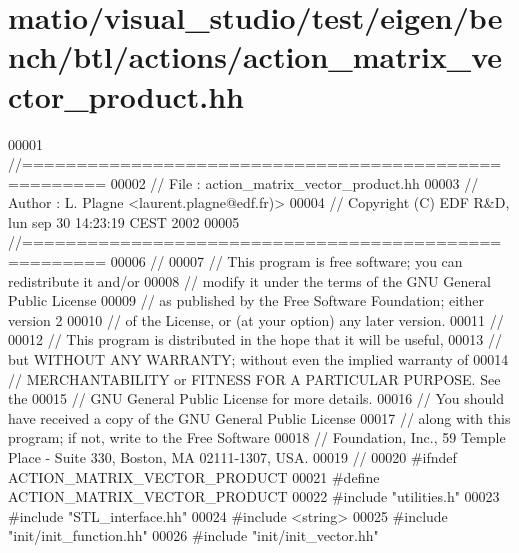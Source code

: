 \hypertarget{matio_2visual__studio_2test_2eigen_2bench_2btl_2actions_2action__matrix__vector__product_8hh_source}{}\section{matio/visual\+\_\+studio/test/eigen/bench/btl/actions/action\+\_\+matrix\+\_\+vector\+\_\+product.hh}
\label{matio_2visual__studio_2test_2eigen_2bench_2btl_2actions_2action__matrix__vector__product_8hh_source}

\begin{DoxyCode}
00001 \textcolor{comment}{//=====================================================}
00002 \textcolor{comment}{// File   :  action\_matrix\_vector\_product.hh}
00003 \textcolor{comment}{// Author :  L. Plagne <laurent.plagne@edf.fr)>}
00004 \textcolor{comment}{// Copyright (C) EDF R&D,  lun sep 30 14:23:19 CEST 2002}
00005 \textcolor{comment}{//=====================================================}
00006 \textcolor{comment}{//}
00007 \textcolor{comment}{// This program is free software; you can redistribute it and/or}
00008 \textcolor{comment}{// modify it under the terms of the GNU General Public License}
00009 \textcolor{comment}{// as published by the Free Software Foundation; either version 2}
00010 \textcolor{comment}{// of the License, or (at your option) any later version.}
00011 \textcolor{comment}{//}
00012 \textcolor{comment}{// This program is distributed in the hope that it will be useful,}
00013 \textcolor{comment}{// but WITHOUT ANY WARRANTY; without even the implied warranty of}
00014 \textcolor{comment}{// MERCHANTABILITY or FITNESS FOR A PARTICULAR PURPOSE.  See the}
00015 \textcolor{comment}{// GNU General Public License for more details.}
00016 \textcolor{comment}{// You should have received a copy of the GNU General Public License}
00017 \textcolor{comment}{// along with this program; if not, write to the Free Software}
00018 \textcolor{comment}{// Foundation, Inc., 59 Temple Place - Suite 330, Boston, MA  02111-1307, USA.}
00019 \textcolor{comment}{//}
00020 \textcolor{preprocessor}{#ifndef ACTION\_MATRIX\_VECTOR\_PRODUCT}
00021 \textcolor{preprocessor}{#define ACTION\_MATRIX\_VECTOR\_PRODUCT}
00022 \textcolor{preprocessor}{#include "utilities.h"}
00023 \textcolor{preprocessor}{#include "STL\_interface.hh"}
00024 \textcolor{preprocessor}{#include <string>}
00025 \textcolor{preprocessor}{#include "init/init\_function.hh"}
00026 \textcolor{preprocessor}{#include "init/init\_vector.hh"}

\end{DoxyCode}
